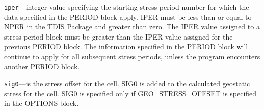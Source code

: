 \begin{description}
\item \texttt{iper}---integer value specifying the starting stress period number for which the data specified in the PERIOD block apply.  IPER must be less than or equal to NPER in the TDIS Package and greater than zero.  The IPER value assigned to a stress period block must be greater than the IPER value assigned for the previous PERIOD block.  The information specified in the PERIOD block will continue to apply for all subsequent stress periods, unless the program encounters another PERIOD block.

\item \texttt{sig0}---is the stress offset for the cell. SIG0 is added to the calculated geostatic stress for the cell. SIG0 is specified only if GEO\_STRESS\_OFFSET is specified in the OPTIONS block.

\end{description}

